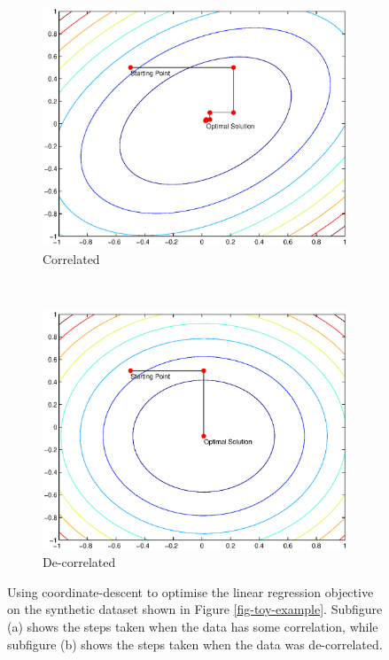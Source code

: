 \documentclass[useAMS,usenatbib,fleqn]{mn2e}
\begin{document}
\begin{figure}
        \centering
        \begin{subfigure}[b]{0.45\columnwidth}
                 \includegraphics[width=\textwidth]{figures/correlated.eps}
                 \caption{Correlated}
        \end{subfigure}
        ~
        \begin{subfigure}[b]{0.45\columnwidth}
                 \includegraphics[width=\textwidth]{figures/decorrelated.eps}
                 \caption{De-correlated}
        \end{subfigure}
       \caption{Using coordinate-descent to optimise the linear regression objective on the synthetic dataset shown in Figure \ref{fig-toy-example}. Subfigure (a) shows the steps taken when the data has some correlation, while subfigure (b) shows the steps taken when the data was de-correlated.}
	\label{fig-error-surface}
\end{figure}
\end{document}
